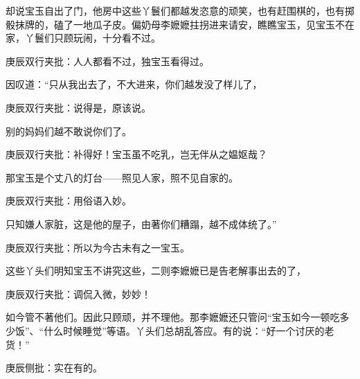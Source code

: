 \begin{parag}


    却说宝玉自出了门，他房中这些丫鬟们都越发恣意的顽笑，也有赶围棋的，也有掷骰抹牌的，磕了一地瓜子皮。偏奶母李嬷嬷拄拐进来请安，瞧瞧宝玉，见宝玉不在家，丫鬟们只顾玩闹，十分看不过。\begin{note}庚辰双行夹批：人人都看不过，独宝玉看得过。\end{note}因叹道：“只从我出去了，不大进来，你们越发没了样儿了，\begin{note}庚辰双行夹批：说得是，原该说。\end{note}别的妈妈们越不敢说你们了。\begin{note}庚辰双行夹批：补得好！宝玉虽不吃乳，岂无伴从之媪妪哉？\end{note}那宝玉是个丈八的灯台——照见人家，照不见自家的。\begin{note}庚辰双行夹批：用俗语入妙。\end{note}只知嫌人家脏，这是他的屋子，由著你们糟蹋，越不成体统了。”\begin{note}庚辰双行夹批：所以为今古未有之一宝玉。\end{note}这些丫头们明知宝玉不讲究这些，二则李嬷嬷已是告老解事出去的了，\begin{note}庚辰双行夹批：调侃入微，妙妙！\end{note}如今管不著他们。因此只顾顽，并不理他。那李嬷嬷还只管问“宝玉如今一顿吃多少饭”、“什么时候睡觉”等语。丫头们总胡乱答应。有的说：“好一个讨厌的老货！”\begin{note}庚辰侧批：实在有的。\end{note}
\end{parag}


